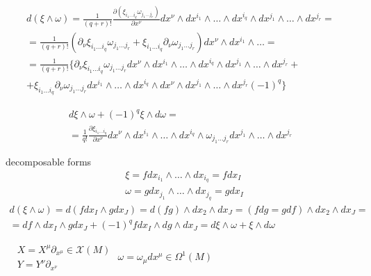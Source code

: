 \documentclass[twoside]{amsart}
\begin{document}
\[
\begin{gathered}
  d(\xi \wedge \omega) = \frac{1}{ (q+r)!} \frac{ \partial ( \xi_{i_1 \dots i_q} \omega_{j_1 \dots j_r} )}{ \partial x^{\nu} }dx^{\nu} \wedge dx^{i_1} \wedge \dots \wedge dx^{i_q} \wedge dx^{j_1} \wedge \dots \wedge dx^{j_r} = \\ 
    = \frac{1}{(q+r)!} ( \partial_{\nu} \xi_{i_1 \dots i_q} \omega_{j_1 \dots j_r} + \xi_{i_1 \dots i_q} \partial_{\nu} \omega_{j_1 \dots j_r} ) dx^{\nu} \wedge dx^{i_1} \wedge \dots = \\
    = \frac{1}{ (q+r)!} \lbrace \partial_{\nu} \xi_{i_1 \dots i_q} \omega_{j_1 \dots j_r} dx^{\nu} \wedge dx^{i_1} \wedge \dots \wedge dx^{i_q} \wedge dx^{j_1} \wedge \dots \wedge dx^{j_r} + \\
    + \xi_{i_1 \dots i_q} \partial_{\nu} \omega_{j_1 \dots j_r} dx^{i_1} \wedge \dots \wedge dx^{i_q} \wedge dx^{\nu} \wedge dx^{j_1} \wedge \dots \wedge dx^{j_r} (-1)^q \rbrace 
\end{gathered}
\]

\[
\begin{gathered}
  d\xi \wedge \omega + (-1)^q \xi \wedge d\omega = \\
  = \frac{1}{q!} \frac{ \partial \xi_{i_1 \dots i_q} }{ \partial x^{\nu} } dx^{\nu} \wedge dx^{i_1} \wedge \dots \wedge dx^{i_q} \wedge \omega_{j_1 \dots j_r} dx^{j_1} \wedge \dots \wedge dx^{j_r} 
\end{gathered}
\]

decomposable forms 
\[
\begin{aligned}
  & \xi = f dx_{i_1} \wedge \dots \wedge dx_{i_q} = fdx_I \\ 
  & \omega = gdx_{j_1} \wedge \dots \wedge dx_{j_q} = gdx_I
\end{aligned}
\]
\[
\begin{gathered}
  d(\xi \wedge \omega) = d(fdx_I \wedge g dx_J) = d(fg) \wedge dx_2 \wedge dx_J = (fdg = gdf ) \wedge dx_2 \wedge dx_J = \\
  = df \wedge dx_I \wedge g dx_J + (-1)^q fdx_I \wedge dg \wedge dx_J = d\xi \wedge \omega + \xi \wedge d\omega
\end{gathered}
\]

$\begin{aligned}
  & X = X^{\mu} \partial_{x^{\mu }} \in \mathcal{X}{(M)} \\ 
  & Y = Y^{\nu} \partial_{x^{\nu }}\end{aligned}$ \quad \quad \quad $\omega = \omega_{\mu} dx^{\mu} \in \Omega^1(M)$
\end{document}
